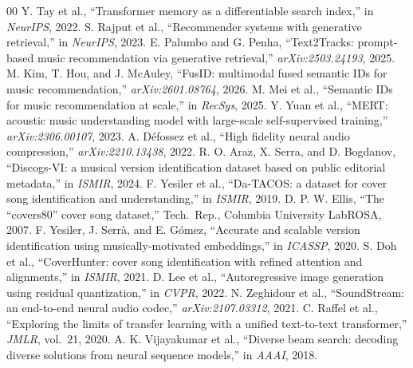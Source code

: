 \documentclass[conference]{IEEEtran}
\begin{document}
\begin{thebibliography}{00}
 Y. Tay et al., ``Transformer memory as a differentiable search index,'' in \emph{NeurIPS}, 2022.
 S. Rajput et al., ``Recommender systems with generative retrieval,'' in \emph{NeurIPS}, 2023.
 E. Palumbo and G. Penha, ``Text2Tracks: prompt-based music recommendation via generative retrieval,'' \emph{arXiv:2503.24193}, 2025.
 M. Kim, T. Hou, and J. McAuley, ``FusID: multimodal fused semantic IDs for music recommendation,'' \emph{arXiv:2601.08764}, 2026.
 M. Mei et al., ``Semantic IDs for music recommendation at scale,'' in \emph{RecSys}, 2025.
 Y. Yuan et al., ``MERT: acoustic music understanding model with large-scale self-supervised training,'' \emph{arXiv:2306.00107}, 2023.
 A. D{\'e}fossez et al., ``High fidelity neural audio compression,'' \emph{arXiv:2210.13438}, 2022.
 R. O. Araz, X. Serra, and D. Bogdanov, ``Discogs-VI: a musical version identification dataset based on public editorial metadata,'' in \emph{ISMIR}, 2024.
 F. Yesiler et al., ``Da-TACOS: a dataset for cover song identification and understanding,'' in \emph{ISMIR}, 2019.
 D. P. W. Ellis, ``The ``covers80'' cover song dataset,'' Tech.\ Rep., Columbia University LabROSA, 2007.
 F. Yesiler, J. Serr{\`a}, and E. G{\'o}mez, ``Accurate and scalable version identification using musically-motivated embeddings,'' in \emph{ICASSP}, 2020.
 S. Doh et al., ``CoverHunter: cover song identification with refined attention and alignments,'' in \emph{ISMIR}, 2021.
 D. Lee et al., ``Autoregressive image generation using residual quantization,'' in \emph{CVPR}, 2022.
 N. Zeghidour et al., ``SoundStream: an end-to-end neural audio codec,'' \emph{arXiv:2107.03312}, 2021.
 C. Raffel et al., ``Exploring the limits of transfer learning with a unified text-to-text transformer,'' \emph{JMLR}, vol.~21, 2020.
 A. K. Vijayakumar et al., ``Diverse beam search: decoding diverse solutions from neural sequence models,'' in \emph{AAAI}, 2018.
\end{thebibliography}
\end{document}
